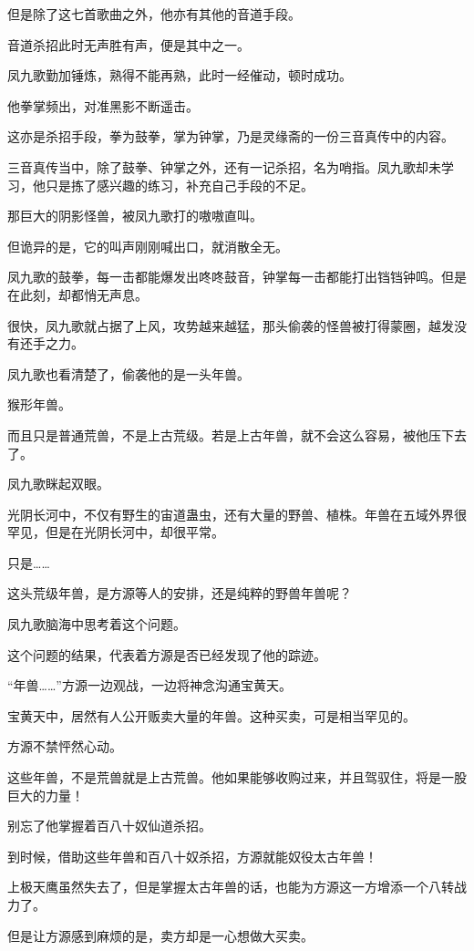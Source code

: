 \begin{this_body}
但是除了这七首歌曲之外，他亦有其他的音道手段。

音道杀招此时无声胜有声，便是其中之一。

凤九歌勤加锤炼，熟得不能再熟，此时一经催动，顿时成功。

他拳掌频出，对准黑影不断遥击。

这亦是杀招手段，拳为鼓拳，掌为钟掌，乃是灵缘斋的一份三音真传中的内容。

三音真传当中，除了鼓拳、钟掌之外，还有一记杀招，名为哨指。凤九歌却未学习，他只是拣了感兴趣的练习，补充自己手段的不足。

那巨大的阴影怪兽，被凤九歌打的嗷嗷直叫。

但诡异的是，它的叫声刚刚喊出口，就消散全无。

凤九歌的鼓拳，每一击都能爆发出咚咚鼓音，钟掌每一击都能打出铛铛钟鸣。但是在此刻，却都悄无声息。

很快，凤九歌就占据了上风，攻势越来越猛，那头偷袭的怪兽被打得蒙圈，越发没有还手之力。

凤九歌也看清楚了，偷袭他的是一头年兽。

猴形年兽。

而且只是普通荒兽，不是上古荒级。若是上古年兽，就不会这么容易，被他压下去了。

凤九歌眯起双眼。

光阴长河中，不仅有野生的宙道蛊虫，还有大量的野兽、植株。年兽在五域外界很罕见，但是在光阴长河中，却很平常。

只是……

这头荒级年兽，是方源等人的安排，还是纯粹的野兽年兽呢？

凤九歌脑海中思考着这个问题。

这个问题的结果，代表着方源是否已经发现了他的踪迹。

“年兽……”方源一边观战，一边将神念沟通宝黄天。

宝黄天中，居然有人公开贩卖大量的年兽。这种买卖，可是相当罕见的。

方源不禁怦然心动。

这些年兽，不是荒兽就是上古荒兽。他如果能够收购过来，并且驾驭住，将是一股巨大的力量！

别忘了他掌握着百八十奴仙道杀招。

到时候，借助这些年兽和百八十奴杀招，方源就能奴役太古年兽！

上极天鹰虽然失去了，但是掌握太古年兽的话，也能为方源这一方增添一个八转战力了。

但是让方源感到麻烦的是，卖方却是一心想做大买卖。


\end{this_body}
